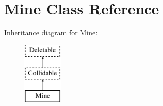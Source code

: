 \hypertarget{class_mine}{\section{Mine Class Reference}
\label{class_mine}
}
Inheritance diagram for Mine\+:\begin{figure}[H]
\begin{center}
\leavevmode
\includegraphics[height=3.000000cm]{class_mine}
\end{center}
\end{figure}
